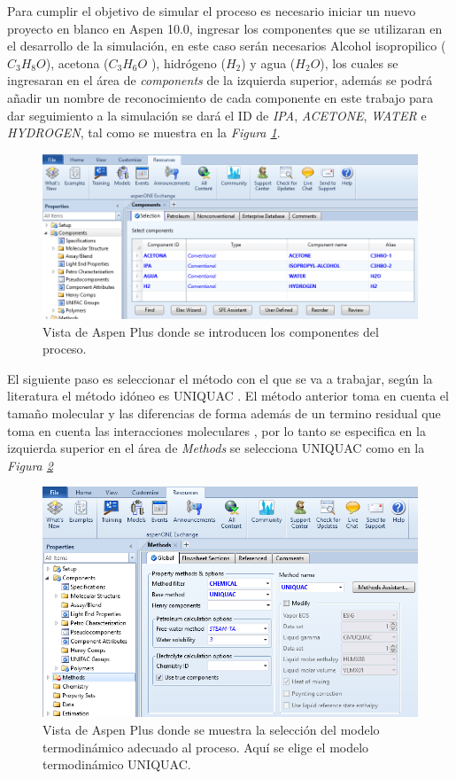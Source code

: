     Para cumplir el objetivo de simular el proceso es necesario  iniciar un nuevo proyecto en blanco en Aspen 10.0, ingresar los componentes que se utilizaran en el desarrollo de la simulación, en este caso serán  necesarios Alcohol isopropilico ($C_3H_8O$), acetona ($C_3H_6O$ ), hidrógeno ($H_2$) y agua ($H_2O$), los cuales se ingresaran en el área de \textit{components} de la izquierda superior, además  se podrá añadir un nombre de reconocimiento de cada componente en este trabajo  para dar seguimiento a la simulación se dará el ID de \textit{ IPA},\textit{ ACETONE},\textit{ WATER} e \textit{ HYDROGEN}, tal
    como se muestra en la \textit{Figura \ref{fig:componentes}}.
        \begin{figure}[H]
            \centering
            \includegraphics[scale =0.5]{images/Paso _1.PNG}
            \caption{Vista de Aspen Plus donde se introducen los componentes del proceso.}
            \label{fig:componentes}
        \end{figure}
    El siguiente paso es seleccionar el método con el que se va a trabajar, según la literatura  el método idóneo es UNIQUAC \cite{article}. El método anterior  toma en cuenta el tamaño molecular  y las diferencias de forma además de un termino residual que toma en cuenta las interacciones moleculares \cite{smith1997introduccion}, por lo tanto se especifica en la izquierda superior en el área de \textit{Methods} se selecciona UNIQUAC como en la \textit{Figura \ref{fig:Modelotermodinamico}}
        \begin{figure}[H]
            \centering
            \includegraphics[scale=0.5]{images/Paso_2.PNG}
            \caption{Vista de Aspen Plus donde se muestra la selección del modelo termodinámico adecuado al proceso. Aquí se elige el modelo termodinámico UNIQUAC.}
            \label{fig:Modelotermodinamico}
        \end{figure}

